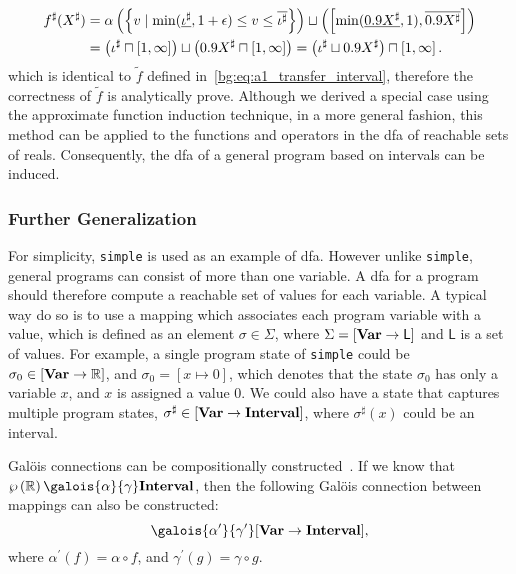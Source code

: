 \begin{equation}
    \begin{aligned}
        f^\sharp(X^\sharp)
        &= \alpha \left( \left\{
            v \mid
            \min(\underline{\iota^\sharp}, 1 + \epsilon)
                \leq v \leq \overline{\iota^\sharp}
        \right\} \right) \sqcup
        \left( \left[{
            \min(\underline{0.9X^\sharp}, 1)
        }, {\overline{0.9X^\sharp}}\right] \right) \\
        &= \left( \iota^\sharp \sqcap \left[{1}, {\infty}\right] \right) \sqcup
           \left( 0.9 X^\sharp \sqcap \left[{1}, {\infty}\right] \right)
         = \left( \iota^\sharp \sqcup 0.9 X^\sharp \right) \sqcap
           \left[{1}, {\infty}\right].
    \end{aligned}
\end{equation}
which is identical to $\tilde{f}$ defined
in~\eqref{bg:eq:a1_transfer_interval}, therefore the correctness of $\tilde{f}$
is analytically prove.  Although we derived a special case using the
approximate function induction technique, in a more general fashion, this
method can be applied to the functions and operators in the \gls{dfa} of
reachable sets of reals.  Consequently, the \gls{dfa} of a general program
based on intervals can be induced.

\subsubsection{Further Generalization}

For simplicity, \verb|simple| is used as an example of \gls{dfa}\@.  However
unlike \verb|simple|, general programs can consist of more than one variable.
A \gls{dfa} for a program should therefore compute a reachable set of values
for each variable.  A typical way do so is to use a mapping which associates
each program variable with a value, which is defined as an element $\sigma \in
\Sigma$, where $\Sigma = \left[\mathbf{Var} \to \mathsf{L}\right]$ and $\mathsf{L}$
is a set of values.  For example, a single program state of \verb|simple| could
be $\sigma_0 \in \left[\mathbf{Var} \to \mathbb{R}\right]$, and $\sigma_0 = [x \mapsto
0]$, which denotes that the state $\sigma_0$ has only a variable $x$, and $x$
is assigned a value $0$.  We could also have a state that captures multiple
program states, $\sigma^\sharp \in \left[\mathbf{Var} \to \mathbf{Interval}\right]$,
where $\sigma^\sharp(x)$ could be an interval.

Gal\"ois connections can be compositionally constructed~\cite{nielson99}.  If
we know that $\powersetof\realset \galois{\alpha}{\gamma} \intervalset$, then
the following Gal\"ois connection between mappings can also be constructed:
\begin{equation}
    [\varset \to \powersetof\realset]
        \galois{\alpha^\prime}{\gamma^\prime}
    [\varset \to \intervalset],
\end{equation}
where $\alpha^\prime(f) = \alpha \circ f$, and $\gamma^\prime(g) = \gamma \circ
g$.


